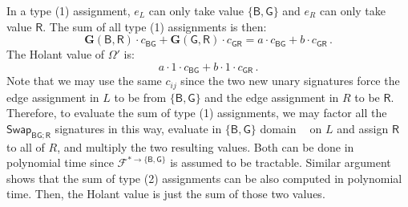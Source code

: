 \documentclass[11pt]{article}
\DeclareMathOperator{\holbs}{Holant^*_2}
\newcommand{\db}{\mathsf{B}}
\newcommand{\dg}{\mathsf{G}}
\newcommand{\dr}{\mathsf{R}}
\newcommand{\swhelper}[1]{$\mathsf{Swap}_{#1}$\xspace}
\newcommand{\swbg}{\swhelper{\db \dg; \dr}}
\newcommand{\domres}[1]{
  ^{*\to\{#1\}}
}
\begin{document}
In a type (1) assignment, $e_L$ can only take value $\{\db, \dg\}$ and $e_R$ can only take value $\dr$.
The sum of all type (1) assignments is then:
\[
  \mathbf{G}(\db, \dr) \cdot c_{\db \dg} + \mathbf{G}(\dg, \dr) \cdot c_{\dg \dr} = a \cdot c_{\db \dg} + b \cdot c_{\dg \dr} 
  \, .
\]
The Holant value of $\Omega'$ is: 
\[
  a \cdot 1 \cdot c_{\db \dg} + b \cdot 1 \cdot c_{\dg \dr}
  \, .
\]
Note that we may use the same $c_{ij}$ since the two new unary signatures force the edge assignment in $L$ to be from $\{\db, \dg\}$ and the edge assignment in $R$ to be $\dr$.
Therefore, to evaluate the sum of type (1) assignments, we may factor all the \swbg signatures in this way, evaluate in $\{\db, \dg\}$ domain $\holbs$ on $L$ and assign $\dr$ to all of $R$, and multiply the two resulting values.
Both can be done in polynomial time since $\mathcal{F}\domres{\db, \dg}$ is assumed to be tractable.
Similar argument shows that the sum of type (2) assignments can be also computed in polynomial time.
Then, the Holant value is just the sum of those two values. 
\end{document}
